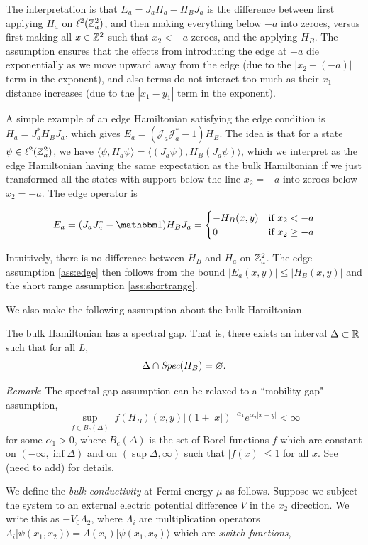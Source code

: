 \documentclass[12pt, letterpaper]{article}
\begin{document}
The interpretation is that $E_a = J_aH_a - H_BJ_a$ is the difference between first applying $H_a$ on $\ell^2(\mathbb{Z}^2_a)$, and then making everything below $-a$ into zeroes, versus first making all $x \in \mathbb{Z}^2$ such that $x_2 < -a$ zeroes, and the applying $H_B$. The assumption ensures that the effects from introducing the edge at $-a$ die exponentially as we move upward away from the edge (due to the $|x_2 - (-a)|$ term in the exponent), and also terms do not interact too much as their $x_1$ distance increases (due to the $|x_1-y_1|$ term in the exponent). 

A simple example of an edge Hamiltonian satisfying the edge condition is $H_a = J_a^*H_BJ_a$, which gives $E_a = (\mathcal{J}_a\mathcal{J}_a^*-1)H_B$. The idea is that for a state $\psi \in \ell^2(\mathbb{Z}^2_a)$, we have $\langle \psi, H_a \psi \rangle = \langle (J_a \psi), H_B (J_a\psi) \rangle$, which we interpret as the edge Hamiltonian having the same expectation as the bulk Hamiltonian if we just transformed all the states with support below the line $x_2=-a$ into zeroes below $x_2=-a$.  The edge operator is 

\[E_a = (J_aJ_a^*-\One)H_BJ_a = \begin{cases} -H_B(x,y) & \text{if } x_2 < -a \\ 0 & \text{if } x_2\geq -a\end{cases}\]

Intuitively, there is no difference between $H_B$ and $H_a$ on $\mathbb{Z}^2_a$. The edge assumption \ref{ass:edge} then follows from the bound $|E_a(x,y)|\leq |H_B(x,y)|$ and the short range assumption \ref{ass:shortrange}.

We also make the following assumption about the bulk Hamiltonian.

\begin{assumption}
The bulk Hamiltonian has a spectral gap. That is, there exists an interval $\Delta \subset \mathbb{R}$ such that for all $L$, 
\[\Delta \cap \emph{Spec}(H_B) = \varnothing.\]
\end{assumption}

\textit{Remark}: The spectral gap assumption can be relaxed to a ``mobility gap" assumption,
\[\sup_{f \in B_c(\Delta)}|f(H_B)(x,y)|(1+|x|)^{-\alpha_1}e^{\alpha_2|x-y|} < \infty\]
for some $\alpha_1>0$, where $B_c(\Delta)$ is the set of Borel functions $f$ which are constant on $(-\infty,\inf \Delta)$ and on $(\sup \Delta, \infty)$ such that $|f(x)| \leq 1$ for all $x$. See (need to add) for details.

We define the \textit{bulk conductivity} at Fermi energy $\mu$ as follows. Suppose we subject the system to an external electric potential difference $V$ in the $x_2$ direction. We write this as $-V_0 \Lambda_2$, where $\Lambda_i$ are multiplication operators $\Lambda_i |\psi(x_1,x_2)\rangle = \Lambda(x_i)|\psi(x_1,x_2)\rangle$ which are \textit{switch functions},
\end{document}
